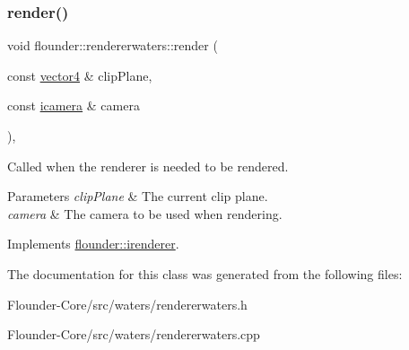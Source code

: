 \subsubsection{\texorpdfstring{render()}{render()}}
{\footnotesize\ttfamily void flounder\+::rendererwaters\+::render (\begin{DoxyParamCaption}\item[{const \hyperlink{classflounder_1_1vector4}{vector4} \&}]{clip\+Plane,  }\item[{const \hyperlink{classflounder_1_1icamera}{icamera} \&}]{camera }\end{DoxyParamCaption})\hspace{0.3cm}{\ttfamily [override]}, {\ttfamily [virtual]}}



Called when the renderer is needed to be rendered. 


\begin{DoxyParams}{Parameters}
{\em clip\+Plane} & The current clip plane. \\
\hline
{\em camera} & The camera to be used when rendering. \\
\hline
\end{DoxyParams}


Implements \hyperlink{classflounder_1_1irenderer_a3f355dc39e2680bf3f3441d3dfaaa010}{flounder\+::irenderer}.



The documentation for this class was generated from the following files\+:\begin{DoxyCompactItemize}
\item 
Flounder-\/\+Core/src/waters/rendererwaters.\+h\item 
Flounder-\/\+Core/src/waters/rendererwaters.\+cpp\end{DoxyCompactItemize}

